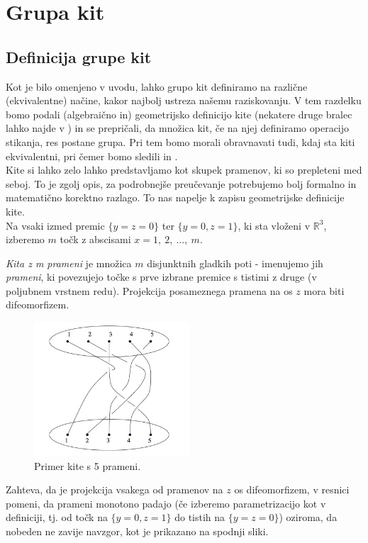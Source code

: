 \documentclass[mat1]{fmfdelo}
\newcommand{\R}{\mathbb R}
\begin{document}
\section{Grupa kit}

\subsection{Definicija grupe kit}

Kot je bilo omenjeno v uvodu, lahko grupo kit definiramo na različne (ekvivalentne) načine, kakor najbolj ustreza našemu raziskovanju. V tem razdelku bomo podali (algebraično in) geometrijsko definicijo kite (nekatere druge bralec lahko najde v \cite{Manturov}) in se prepričali, da množica kit, če na njej definiramo operacijo stikanja, res postane grupa. Pri tem bomo morali obravnavati tudi, kdaj sta kiti ekvivalentni, pri čemer bomo sledili \cite{Burde} in \cite{Manturov}.\\
Kite si lahko zelo lahko predstavljamo kot skupek pramenov, ki so prepleteni med seboj. To je zgolj opis, za podrobnejše preučevanje potrebujemo bolj formalno in matematično korektno razlago. To nas napelje k zapisu geometrijske definicije kite.\\
Na vsaki izmed premic $\{y = z = 0\}$ ter $\{y = 0, z = 1\}$, ki sta vloženi v $\R^3$, izberemo $m$ točk z abscisami $x=1,\ 2,\ \ldots,\ m$.

\begin{definicija}
\emph{Kita z m prameni} je množica $m$ disjunktnih gladkih poti - imenujemo jih \emph{prameni}, ki povezujejo točke s prve izbrane premice s tistimi z druge (v poljubnem vrstnem redu). Projekcija posameznega pramena na os $z$ mora biti difeomorfizem.
\end{definicija}

\begin{figure}[ht!]
\includegraphics[height = 5cm]{Primer_kite_1}
\caption{Primer kite s 5 prameni.}
\end{figure}

\begin{opomba}
Zahteva, da je projekcija vsakega od pramenov na $z$ os difeomorfizem, v resnici pomeni, da prameni monotono padajo (če izberemo parametrizacijo kot v definiciji, tj. od točk na $\{y = 0, z = 1\}$ do tistih na $\{y = z = 0\}$) oziroma, da nobeden ne zavije navzgor, kot je prikazano na spodnji sliki.
\end{opomba}
\end{document}
